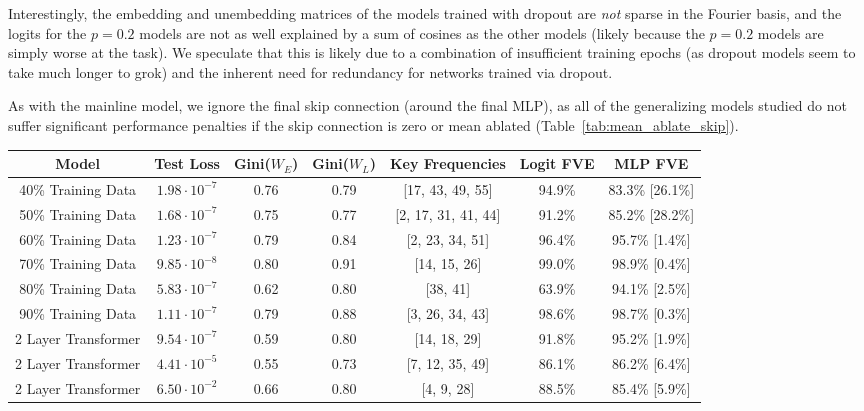 \documentclass{article} %
\begin{document}
Interestingly, the embedding and unembedding matrices of the models trained with dropout are \textit{not} sparse in the Fourier basis, and the logits for the $p=0.2$ models are not as well explained by a sum of cosines as the other models (likely because the $p=0.2$ models are simply worse at the task). We speculate that this is likely due to a combination of insufficient training epochs (as dropout models seem to take much longer to grok) and the inherent need for redundancy for networks trained via dropout.

As with the mainline model, we ignore the final skip connection (around the final MLP), as all of the generalizing models studied do not suffer significant performance penalties if the skip connection is zero or mean ablated (Table~\ref{tab:mean_ablate_skip}).

\begin{table}[]
    \centering
    \scriptsize
    \begin{tabular}{c|c|c|c|c|c|c}
         \textbf{Model} & \textbf{Test Loss} & \textbf{Gini($W_E$)} & \textbf{Gini($W_L$)} & \textbf{Key Frequencies} & \textbf{Logit FVE} & \textbf{MLP FVE} \\
         \hline
            40\% Training Data & $1.98 \cdot 10^{-7}$ & 0.76 & 0.79 & [17, 43, 49, 55] & 94.9\% & 83.3\% [26.1\%] \\
            50\% Training Data & $1.68 \cdot 10^{-7}$ & 0.75 & 0.77 & [2, 17, 31, 41, 44] & 91.2\% & 85.2\% [28.2\%] \\
            60\% Training Data & $1.23 \cdot 10^{-7}$ & 0.79 & 0.84 & [2, 23, 34, 51] & 96.4\% & 95.7\% [1.4\%] \\
            70\% Training Data & $9.85 \cdot 10^{-8}$ & 0.80 & 0.91 & [14, 15, 26] & 99.0\% & 98.9\% [0.4\%] \\
            80\% Training Data & $5.83 \cdot 10^{-7}$ & 0.62 & 0.80 & [38, 41] & 63.9\% & 94.1\% [2.5\%] \\
            90\% Training Data & $1.11 \cdot 10^{-7}$ & 0.79 & 0.88 & [3, 26, 34, 43] & 98.6\% & 98.7\% [0.3\%] \\
        \hline
            2 Layer Transformer & $9.54 \cdot 10^{-7}$ & 0.59 & 0.80 & [14, 18, 29] & 91.8\% & 95.2\% [1.9\%] \\
            2 Layer Transformer & $4.41 \cdot 10^{-5}$ & 0.55 & 0.73 & [7, 12, 35, 49] & 86.1\% & 86.2\% [6.4\%] \\
            2 Layer Transformer & $6.50 \cdot 10^{-2}$ & 0.66 & 0.80 & [4, 9, 28] & 88.5\% & 85.4\% [5.9\%] \\

\end{tabular}
\end{table}
\end{document}
